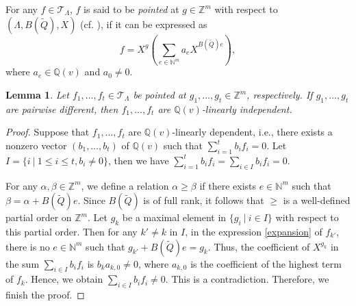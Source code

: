 \documentclass[reqno,12pt]{amsart}
\numberwithin{equation}{section}
\theoremstyle{plain} %
\newtheorem{lemma}[theorem]{\bf Lemma}
\theoremstyle{definition} %
\begin{document}
For any $f\in \mathcal{T}_{\Lambda}$, $f$ is said to be {\em pointed} at $g\in \mathbb{Z}^{m}$ with respect to $(\Lambda,B(\widetilde{Q}),X)$ (cf. \cite{Qin2}), if it can be expressed as
\begin{equation}\label{expansion}f=X^g(\sum_{e\in \mathbb{N}^{m}}a_eX^{B(\widetilde{Q})e}),\end{equation}
where $a_e\in \mathbb{Q}(v)$ and $a_0\neq 0$.
\begin{lemma}\label{lem:pointed-function}
    Let $f_1,\ldots, f_t\in \mathcal{T}_{\Lambda}$ be pointed at $g_1,\ldots, g_t\in \mathbb{Z}^{m}$, respectively. If $g_1,\ldots, g_t$ are pairwise different, then $f_1,\ldots, f_t$ are $\mathbb{Q}(v)$-linearly independent.
\end{lemma}

\begin{proof}
Suppose that $f_1,\ldots, f_t$ are $\mathbb{Q}(v)$-linearly dependent, i.e., there exists a nonzero vector $(b_1,\ldots, b_t)$ of $\mathbb{Q}(v)$  such that
$\sum_{i=1}^t b_i f_i=0$. Let $I=\{i~|~1\leq i\leq t, b_i\neq0\}$, then we have $\sum_{i=1}^t b_i f_i=\sum_{i\in I}b_i f_i=0.$

For any $\alpha,\beta\in \mathbb{Z}^{m}$, we define a relation $\alpha\geq \beta$ if there exists $e\in \mathbb{N}^{m}$ such that $\beta=\alpha+B(\widetilde{Q})e$. Since $B(\widetilde{Q})$ is of full rank, it follows that $\geq$ is a well-defined partial order on $\mathbb{Z}^{m}$.
Let $g_k$ be a maximal element in $\{g_i~|~i\in I\}$ with respect to this partial order.
Then for any $k'\neq k$ in $I$, in the expression \eqref{expansion} of $f_{k'}$, there is no $e\in \mathbb{N}^{m}$ such that $g_{k'}+B(\widetilde{Q})e=g_k$.
Thus, the coefficient of $X^{g_k}$ in the sum $\sum_{i\in I}b_i f_i$ is $b_k a_{k,0}\neq0$, where $a_{k,0}$ is the coefficient of the highest term of $f_k$. Hence, we obtain $\sum_{i\in I}b_i f_i\neq0$. This is a contradiction. Therefore, we finish the proof.
\end{proof}
\end{document}
